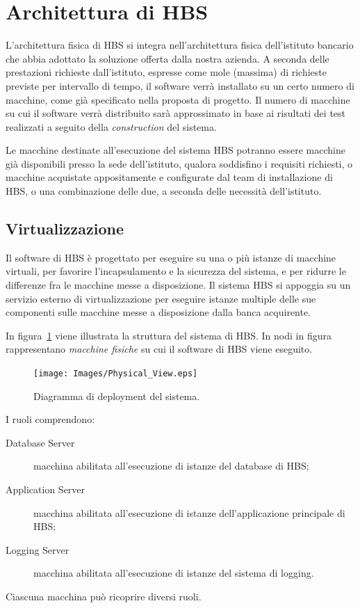 
\section{Architettura di HBS}

L'architettura fisica di HBS si integra nell'architettura fisica dell'istituto bancario che abbia adottato la soluzione offerta dalla nostra azienda.
A seconda delle prestazioni richieste dall'istituto, espresse come mole (massima) di richieste previste per intervallo di tempo, il software verr\`a installato su un certo numero di macchine, come gi\`a specificato nella proposta di progetto.
Il numero di macchine su cui il software verr\`a distribuito sar\`a approssimato in base ai risultati dei test realizzati a seguito della \emph{construction} del sistema.

Le macchine destinate all'esecuzione del sistema HBS potranno essere macchine gi\`a disponibili presso la sede dell'istituto, qualora soddisfino i requisiti richiesti, o macchine acquistate appositamente e configurate dal team di installazione di HBS, o una combinazione delle due, a seconda delle necessit\`a dell'istituto.

\subsection{Virtualizzazione}

Il software di HBS \`e progettato per eseguire su una o pi\`u istanze di macchine virtuali, per favorire l'incapsulamento e la sicurezza del sistema, e per ridurre le differenze fra le macchine messe a disposizione.
Il sistema HBS si appoggia su un servizio esterno di virtualizzazione per eseguire istanze multiple delle sue componenti sulle macchine messe a disposizione dalla banca acquirente.

In figura~\ref{fig:physical-view} viene illustrata la struttura del sistema di HBS.
In nodi in figura rappresentano \emph{macchine fisiche} su cui il software di HBS viene eseguito.

\begin{figure}[h]
	\centering
	\texttt{[image: Images/Physical\_View.eps]}
	\caption{Diagramma di deployment del sistema.}
	\label{fig:physical-view}
\end{figure}

I ruoli comprendono:
\begin{description}
	\item[Database Server] macchina abilitata all'esecuzione di istanze del database di HBS;

	\item[Application Server] macchina abilitata all'esecuzione di istanze dell'applicazione principale di HBS;

	\item[Logging Server] macchina abilitata all'esecuzione di istanze del sistema di logging.
\end{description}
Ciascuna macchina pu\`o ricoprire diversi ruoli.

